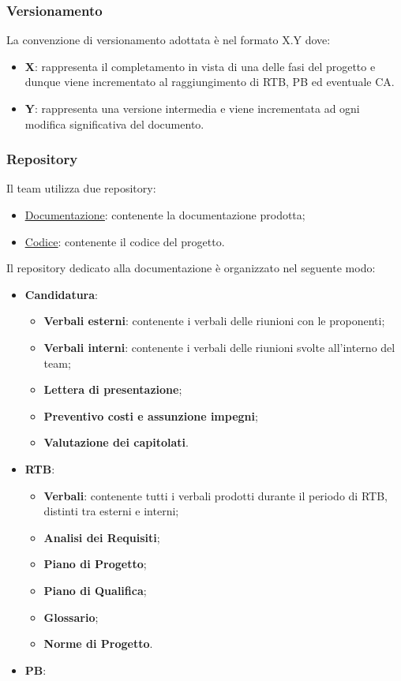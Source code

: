 \subsubsection{Versionamento}
La convenzione di versionamento adottata è nel formato X.Y dove:
\begin{itemize}
	\item \textbf{X}: rappresenta il completamento in vista di una delle fasi del progetto e dunque viene incrementato al raggiungimento di
	      RTB, PB ed eventuale CA.
	\item \textbf{Y}: rappresenta una versione intermedia e viene incrementata ad ogni modifica significativa del documento.
\end{itemize}

\subsubsection{Repository}
Il team utilizza due repository:
\begin{itemize}
	\item \href{https://github.com/7Last/docs.git}{\underline{Documentazione}}: contenente la documentazione prodotta;
	\item \href{https://github.com/7Last/7Last.github.io.git}{\underline{Codice}}: contenente il codice del progetto.
\end{itemize}

Il repository dedicato alla documentazione è organizzato nel seguente modo:
\begin{itemize}
	\item \textbf{Candidatura}:
	      \begin{itemize}
		      \item \textbf{Verbali esterni}: contenente i verbali delle riunioni con le proponenti;
		      \item \textbf{Verbali interni}: contenente i verbali delle riunioni svolte all'interno del team;
		      \item \textbf{Lettera di presentazione};
		      \item \textbf{Preventivo costi e assunzione impegni};
		      \item \textbf{Valutazione dei capitolati}.
	      \end{itemize}
	\item \textbf{RTB}:
	      \begin{itemize}
		      \item \textbf{Verbali}: contenente tutti i verbali prodotti durante il periodo di RTB, distinti tra esterni e interni;
		      \item \textbf{Analisi dei Requisiti};
		      \item \textbf{Piano di Progetto};
		      \item \textbf{Piano di Qualifica};
		      \item \textbf{Glossario};
		      \item \textbf{Norme di Progetto}.
	      \end{itemize}
	\item \textbf{PB}:
\end{itemize}

